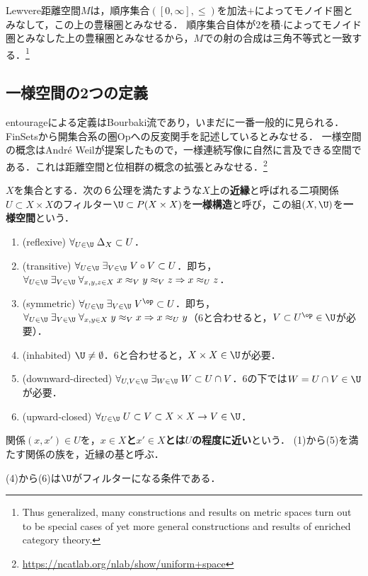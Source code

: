\documentclass[uplatex,dvipdfmx]{jsreport}
\begin{document}
\begin{lemma}
    Lewvere距離空間$M$は，順序集合$([0,\infty],\le)$を加法$+$によってモノイド圏とみなして，この上の豊穣圏とみなせる．
    順序集合自体が$2$を積$\cdot$によってモノイド圏とみなした上の豊穣圏とみなせるから，$M$での射の合成は三角不等式と一致する．\footnote{Thus generalized, many constructions and results on metric spaces turn out to be special cases of yet more general constructions and results of enriched category theory. }
\end{lemma}

\subsection{一様空間の2つの定義}


\begin{tcolorbox}[colframe=ForestGreen, colback=ForestGreen!10!white,breakable,colbacktitle=ForestGreen!40!white,coltitle=black,fonttitle=\bfseries\sffamily,
    title=一様収束の概念による距離空間の一般化である]
    entourageによる定義はBourbaki流であり，いまだに一番一般的に見られる．FinSetsから開集合系の圏Opへの反変関手を記述しているとみなせる．
    一様空間の概念はAndré Weilが提案したもので，一様連続写像に自然に言及できる空間である．これは距離空間と位相群の概念の拡張とみなせる．\footnote{\url{https://ncatlab.org/nlab/show/uniform+space}}
\end{tcolorbox}

\begin{definition}
    $X$を集合とする．次の６公理を満たすような$X$上の\textbf{近縁}と呼ばれる二項関係$U\subset X\times X$のフィルター$\U\subset P(X\times X)$を\textbf{一様構造}と呼び，この組$(X,\U)$を\textbf{一様空間}という．
    \begin{enumerate}
        \item (reflexive) $\forall_{U\in\U}\;\Delta_X\subset U$．
        \item (transitive) $\forall_{U\in\U}\;\exists_{V\in\U}\;V\circ V\subset U$．即ち，$\forall_{U\in\U}\;\exists_{V\in\U}\;\forall_{x,y,z\in X}\;x\approx_V y\approx_V z\Rightarrow x\approx_U z$．
        \item (symmetric) $\forall_{U\in\U}\;\exists_{V\in\U}\;V^\op\subset U$．即ち，$\forall_{U\in\U}\;\exists_{V\in\U}\;\forall_{x,y\in X}\;y\approx_V x\Rightarrow x\approx_Uy$（6と合わせると，$V\subset U^\op\in\U$が必要）．
        \item (inhabited) $\U\ne\emptyset$．6と合わせると，$X\times X\in\U$が必要．
        \item (downward-directed) $\forall_{U,V\in\U}\;\exists_{W\in\U}\;W\subset U\cap V$．6の下では$W=U\cap V\in\U$が必要．
        \item (upward-closed) $\forall_{U\in\U}\;U\subset V\subset X\times X\rightarrow V\in\U$．
    \end{enumerate}
    関係$(x,x')\in U$を，\textbf{$x\in X$と$x'\in X$とは$U$の程度に近い}という．
    (1)から(5)を満たす関係の族を，近縁の基と呼ぶ．
\end{definition}
\begin{remarks}
    (4)から(6)は$\U$がフィルターになる条件である．
\end{remarks}
\end{document}
